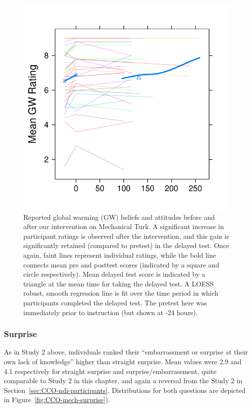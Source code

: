 \begin{figure}
    \centering
    \includegraphics{CCO-mech-GW.pdf}
    \caption{Reported global warming (GW) beliefs and attitudes before and after
        our intervention on Mechanical Turk. A significant increase in
        participant ratings is observed after the intervention, and this gain is
        significantly retained (compared to pretest) in the delayed test. Once
        again, faint lines represent individual ratings, while the bold line
        connects mean pre and posttest scores (indicated by a square and circle
        respectively).  Mean delayed test score is indicated by a triangle at
        the mean time for taking the delayed test. A LOESS robust, smooth
        regression line is fit over the time period in which participants
        completed the delayed test. The pretest here was immediately prior to
        instruction (but shown at -24 hours).}
    \label{fig:CCO-mech-GW}
\end{figure}


\subsubsection{Surprise}

As in Study 2 above, individuals ranked their “embarrassment or surprise at their own
lack of knowledge” higher than straight surprise. Mean values were 2.9 and 4.1
respectively for straight surprise and surprise/embarrassment, quite comparable
to Study 2 in this chapter, and again a reversal from the Study 2 in
Section~\ref{sec:CCO-ndi-participants}. Distributions for both questions are depicted in
Figure~\ref{fig:CCO-mech-surprise}). 

